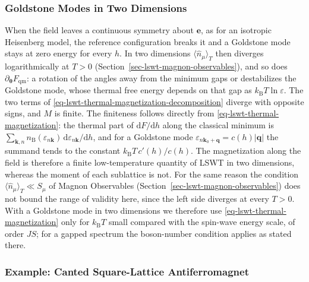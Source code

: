 \subsubsection{Goldstone Modes in Two Dimensions}

When the field leaves a continuous symmetry about \(\mathbf e\), as for an isotropic Heisenberg model, the reference configuration breaks it and a Goldstone mode stays at zero energy for every \(h\). In two dimensions \(\langle\hat n_\mu\rangle_T\) then diverges logarithmically at \(T>0\) (Section~\ref{sec-lswt-magnon-observables}), and so does \(\partial_{\boldsymbol\theta}F_{\mathrm{qm}}\): a rotation of the angles away from the minimum gaps or destabilizes the Goldstone mode, whose thermal free energy depends on that gap as \(k_{\mathrm B}T\ln\varepsilon\). The two terms of \eqref{eq-lswt-thermal-magnetization-decomposition} diverge with opposite signs, and \(M\) is finite. The finiteness follows directly from \eqref{eq-lswt-thermal-magnetization}: the thermal part of \(\mathrm dF/\mathrm dh\) along the classical minimum is \(\sum_{\mathbf k,n}n_{\mathrm B}(\varepsilon_{n\mathbf k})\,\mathrm d\varepsilon_{n\mathbf k}/\mathrm dh\), and for a Goldstone mode \(\varepsilon_{n\mathbf k_0+\mathbf q}=c(h)|\mathbf q|\) the summand tends to the constant \(k_{\mathrm B}T\,c'(h)/c(h)\). The magnetization along the field is therefore a finite low-temperature quantity of LSWT in two dimensions, whereas the moment of each sublattice is not. For the same reason the condition \(\langle\hat n_\mu\rangle_T\ll S_\mu\) of Magnon Observables (Section~\ref{sec-lswt-magnon-observables}) does not bound the range of validity here, since the left side diverges at every \(T>0\). With a Goldstone mode in two dimensions we therefore use \eqref{eq-lswt-thermal-magnetization} only for \(k_{\mathrm B}T\) small compared with the spin-wave energy scale, of order \(JS\); for a gapped spectrum the boson-number condition applies as stated there.

\subsubsection{Example: Canted Square-Lattice Antiferromagnet}

